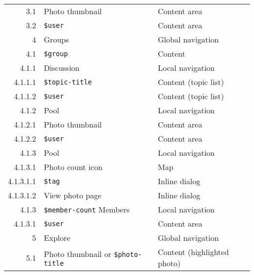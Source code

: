 \documentclass[11pt,a4paper]{article}
\newcommand{\var}[1]{\texttt{\${#1}}}
\begin{document}
\begin{center}
\begin{small}
\begin{longtable}{rll}
        3.1 &
        Photo thumbnail &
        Content area \\

        3.2 &
        \var{user} &
        Content area \\

      4 &
      Groups &
      Global navigation \\

        4.1 &
        \var{group} &
        Content \\

          4.1.1 &
          Discussion &
          Local navigation \\

            4.1.1.1 &
            \var{topic-title} &
            Content (topic list) \\

            4.1.1.2 &
            \var{user} &
            Content (topic list) \\

          4.1.2 &
          Pool &
          Local navigation \\

            4.1.2.1 &
            Photo thumbnail &
            Content area \\

            4.1.2.2 &
            \var{user} &
            Content area \\

          4.1.3 &
          Pool &
          Local navigation \\

            4.1.3.1 &
            Photo count icon &
            Map \\

              4.1.3.1.1 &
              \var{tag} &
              Inline dialog \\

              4.1.3.1.2 &
              View photo page &
              Inline dialog \\

          4.1.3 &
          \var{member-count} Members &
          Local navigation \\

            4.1.3.1 &
            \var{user} &
            Content area \\

      5 &
      Explore &
      Global navigation \\

        5.1 &
        Photo thumbnail or \var{photo-title} &
        Content (highlighted photo) \\


\end{longtable}
\end{small}
\end{center}
\end{document}
